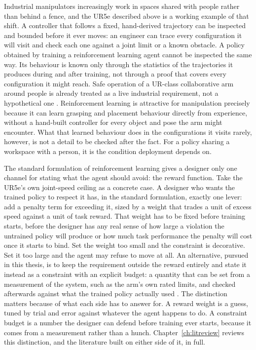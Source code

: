 Industrial manipulators increasingly work in spaces shared with people rather than behind a
fence, and the UR5e described above is a working example of that shift.
A controller that follows a fixed, hand-derived trajectory can be inspected and bounded before it
ever moves: an engineer can trace every configuration it will visit and check each one against a
joint limit or a known obstacle. A policy obtained by training a reinforcement learning agent
cannot be inspected the same way. Its behaviour is known only through the statistics of the
trajectories it produces during and after training, not through a proof that covers every
configuration it might reach. Safe operation of a UR-class collaborative arm around people is
already treated as a live industrial requirement, not a hypothetical one \cite{xia2024proactive}.
Reinforcement learning is attractive for manipulation precisely because it can learn grasping and
placement behaviour directly from experience, without a hand-built controller for every object and
pose the arm might encounter. What that learned behaviour does in the configurations it visits
rarely, however, is not a detail to be checked after the fact. For a policy sharing a workspace
with a person, it is the condition deployment depends on.

The standard formulation of reinforcement learning gives a designer only one channel for stating
what the agent should avoid: the reward function. Take the UR5e's own joint-speed ceiling as a
concrete case. A designer who wants the trained policy to respect it has, in the standard
formulation, exactly one lever: add a penalty term for exceeding it, sized by a weight that trades
a unit of excess speed against a unit of task reward. That weight has to be fixed before training
starts, before the designer has any real sense of how large a violation the untrained policy will
produce or how much task performance the penalty will cost once it starts to bind. Set the weight
too small and the constraint is decorative. Set it too large and the agent may refuse to move at
all. An alternative, pursued in this thesis, is to keep the requirement outside the reward
entirely and state it instead as a constraint with an explicit budget: a quantity that can be set
from a measurement of the system, such as the arm's own rated limits, and checked afterwards
against what the trained policy actually used \cite{achiam2017cpo}. The distinction matters
because of what each side has to answer for. A reward weight is a guess, tuned by trial and error
against whatever the agent happens to do. A constraint budget is a number the designer can defend
before training ever starts, because it comes from a measurement rather than a hunch.
Chapter~\ref{ch:litreview} reviews this distinction, and the literature built on either side of
it, in full.

